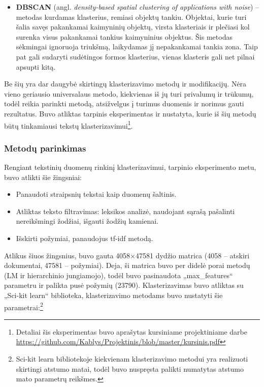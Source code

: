 \documentclass{VUMIFInfBakalaurinis}
\begin{document}
\begin{itemize}
\item
  \textbf{DBSCAN} (angl. \emph{density-based spatial clustering of
  applications with noise}) -- metodas kurdamas klasterius, remiasi
  objektų tankiu. Objektai, kurie turi šalia savęs pakankamai kaimyninių
  objektų, virsta klasteriais ir plečiasi kol surenka visus pakankamai
  tankius kaimyninius objektus. Šis metodas sėkmingai ignoruoja
  triukšmą, laikydamas jį nepakankamai tankia zona. Taip pat gali
  sudaryti sudėtingos formos klasterius, vienas klasteris gali net
  pilnai apsupti kitą.
\end{itemize}

Be šių yra dar daugybė skirtingų klasterizavimo metodų ir modifikacijų.
Nėra vieno geriausio universalaus metodo, kiekvienas iš jų turi
privalumų ir trūkumų, todėl reikia parinkti metodą, atsižvelgus į
turimus duomenis ir norimus gauti rezultatus. Buvo atliktas tarpinis
eksperimentas ir nustatyta, kurie iš šių metodų būtų tinkamiausi tekstų
klasterizavimui\footnote{Detaliai šis eksperimentas buvo aprašytas
  kursiniame projektiniame darbe \url{https://github.com/Kablys/Projektinis/blob/master/kursinis.pdf}}.

\subsubsection{Metodų parinkimas}\label{clustest}

Rengiant tekstinių duomenų rinkinį klasterizavimui, tarpinio eksperimento metu,
buvo atlikti šie žingsniai:

\begin{itemize}
\item
  Panaudoti straipsnių tekstai kaip duomenų šaltinis.
\item
  Atliktas teksto filtravimas: leksikos analizė, naudojant sąrašą
  pašalinti nereikšmingi žodžiai, išgauti žodžių kamienai.
\item
  Išskirti požymiai, panaudojus tf-idf metodą.
\end{itemize}

Atlikus šiuos žingsnius, buvo gauta 4058×47581 dydžio matrica (4058 --
atskiri dokumentai, 47581 -- požymiai). Deja, ši matrica buvo per didelė
porai metodų (LM ir hierarchinio jungiamojo), todėl buvo pasinaudota
„max\_features“ parametru ir palikta pusė požymių (23790).
Klasterizavimas buvo atliktas su „Sci-kit learn“ biblioteka,
klasterizavimo metodams buvo nustatyti šie parametrai:\footnote{Sci-kit
  learn bibliotekoje kiekvienam klasterizavimo metodui yra realizuoti
  skirtingi atstumo matai, todėl buvo nuspręsta palikti numatytas
  atstumo mato parametrų reikšmes.}
\end{document}
